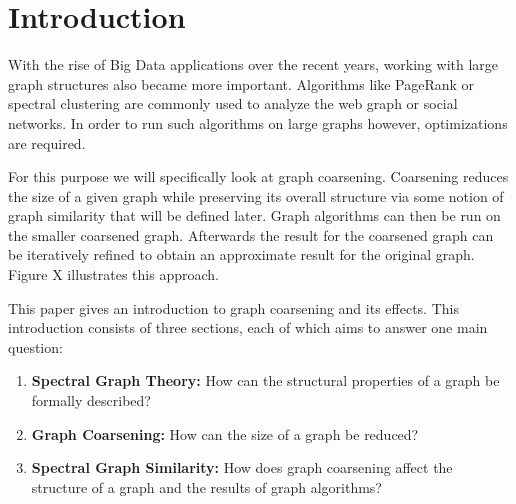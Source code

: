 \section{Introduction}%
\label{sec:intro}

\setcounter{page}{1}			%

With the rise of Big Data applications over the recent years, working with large graph structures also became more important.
Algorithms like PageRank or spectral clustering are commonly used to analyze the web graph or social networks.
In order to run such algorithms on large graphs however, optimizations are required.

For this purpose we will specifically look at graph coarsening.
Coarsening reduces the size of a given graph while preserving its overall structure via some notion of graph similarity that will be defined later.
Graph algorithms can then be run on the smaller coarsened graph.
Afterwards the result for the coarsened graph can be iteratively refined to obtain an approximate result for the original graph.
Figure X illustrates this approach.

This paper gives an introduction to graph coarsening and its effects.
This introduction consists of three sections, each of which aims to answer one main question:
\begin{enumerate}
	\item \textbf{Spectral Graph Theory:} How can the structural properties of a graph be formally described?
	\item \textbf{Graph Coarsening:} How can the size of a graph be reduced?
	\item \textbf{Spectral Graph Similarity:} How does graph coarsening affect the structure of a graph and the results of graph algorithms?
\end{enumerate}
